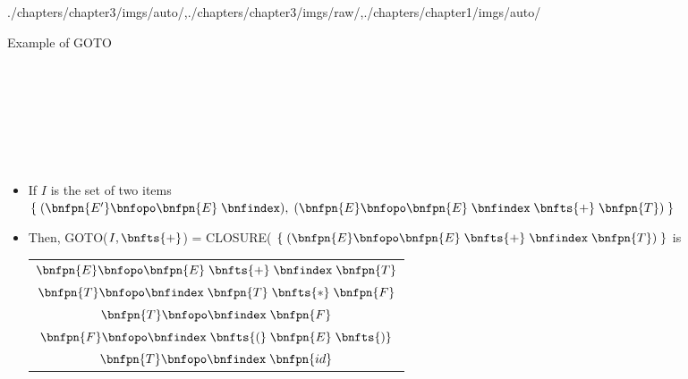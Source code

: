\begin{graphicspathcontext}{{./chapters/chapter3/imgs/auto/},{./chapters/chapter3/imgs/raw/},{./chapters/chapter1/imgs/auto/}}
\begin{bibunit}[apalike]
\begin{frame}{Example of GOTO}
	\begin{center}\scriptsize
		\begin{minipage}{.4\linewidth}\begin{bnf}
			 \\
			 \\
			 \\
			 \\
			 \\
			 \\
		\end{bnf}\end{minipage}
	\end{center}
	\begin{itemize}
	\item If $I$ is the set of two items $\left\{ \; (\bnfpn{E'} \bnfopo \bnfpn{E} \; \bnfindex), \; (\bnfpn{E} \bnfopo \bnfpn{E} \; \bnfindex \; \bnfts{+} \; \bnfpn{T}) \; \right\}$
	\item Then, GOTO($I,\bnfts{+}$) = CLOSURE( $\{ \; (\bnfpn{E} \bnfopo \bnfpn{E} \; \bnfts{+} \; \bnfindex \; \bnfpn{T}) \; \}$ is \\
		\begin{center}\begin{scriptsize}
		\begin{tabular}[t]{|c|}
			\hline
			$\bnfpn{E} \bnfopo \bnfpn{E} \; \bnfts{+} \; \bnfindex \; \bnfpn{T}$ \\
			$\bnfpn{T} \bnfopo \bnfindex \; \bnfpn{T} \; \bnfts{*} \; \bnfpn{F}$ \\
			$\bnfpn{T} \bnfopo \bnfindex \; \bnfpn{F}$ \\
			$\bnfpn{F} \bnfopo \bnfindex \; \bnfts{(} \; \bnfpn{E} \; \bnfts{)}$ \\
			$\bnfpn{T} \bnfopo \bnfindex \; \bnfpn{id}$ \\
			\hline
		\end{tabular}
		\end{scriptsize}\end{center}
	\end{itemize}
\end{frame}


\end{bibunit}
\end{graphicspathcontext}
